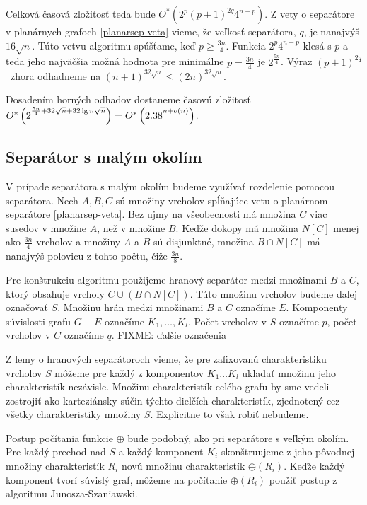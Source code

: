 Celková časová
zložitosť teda bude $O^*(2^p (p+1)^{2q} 4^{n-p})$. Z vety o separátore v planárnych grafoch \ref{planarsep-veta}
vieme, že veľkosť separátora, $q$, je nanajvýš $16\sqrt{n}$. Túto vetvu algoritmu spúšťame, keď $p \ge \frac{3n}{4}$.
Funkcia $2^p 4^{n-p}$ klesá s $p$ a teda jeho najväčšia možná hodnota pre minimálne $p = \frac{3n}{4}$ je
$2^{\frac{5n}{4}}$. Výraz $(p+1)^{2q}$ zhora odhadneme na $(n+1)^{32\sqrt{n}} \leq (2n)^{32\sqrt{n}}$.

Dosadením horných odhadov dostaneme časovú zložitosť $O^*\left(2\strut^{\frac{5n}{4} + 32\sqrt{n} + 32\lg{n}\sqrt{n}}\right) = O^*\left(2.38\strut^{n + o(n)}\right)$.

\subsection{Separátor s malým okolím}

V prípade separátora s malým okolím budeme využívať rozdelenie pomocou separátora. Nech $A, B, C$ sú množiny
vrcholov spĺňajúce vetu o planárnom separátore \ref{planarsep-veta}. Bez ujmy na všeobecnosti má množina $C$
viac susedov v množine $A$, než v množine $B$. Keďže dokopy má množina $N[C]$ menej ako $\frac{3n}{4}$ vrcholov
a množiny $A$ a $B$ sú disjunktné, množina $B \cap N[C]$ má nanajvýš polovicu z tohto počtu, čiže $\frac{3n}{8}$.

Pre konštrukciu algoritmu použijeme hranový separátor medzi množinami $B$ a $C$, ktorý obsahuje vrcholy
$C \cup (B \cap N[C])$. Túto množinu vrcholov budeme ďalej označovať $S$. Množinu hrán medzi množinami
$B$ a $C$ označíme $E$. Komponenty súvislosti grafu $G-E$ označíme $K_1, \ldots, K_l$. Počet vrcholov v $S$
označíme $p$, počet vrcholov v $C$ označíme $q$. FIXME: ďalšie označenia

Z lemy o hranových separátoroch vieme, že pre zafixovanú charakteristiku vrcholov $S$ môžeme pre každý
z komponentov $K_1 \ldots K_l$ ukladať množinu jeho charakteristík nezávisle. Množinu charakteristík
celého grafu by sme vedeli zostrojiť ako karteziánsky súčin týchto dielčích charakteristík, zjednotený cez
všetky charakteristiky množiny $S$. Explicitne to však robiť nebudeme.

Postup počítania funkcie $\oplus$ bude podobný, ako pri separátore s veľkým okolím. Pre každý prechod nad $S$
a každý komponent $K_i$ skonštruujeme z jeho pôvodnej
množiny charakteristík $R_i$ novú množinu charakteristík $\oplus(R_i)$. Keďže každý komponent tvorí súvislý
graf, môžeme na počítanie $\oplus(R_i)$ použiť postup z algoritmu Junosza-Szaniawski.

